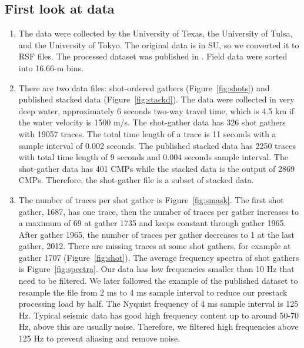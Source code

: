 \subsection{First look at data}

\begin{enumerate}

\item The data were collected by the University of Texas, the University of Tulsa, and the University of Tokyo. The original data is in SU, so we converted it to RSF files. The processed dataset was published in \cite{Moore}. Field data were sorted into 16.66-m bins.   

\item There are two data files: shot-ordered gathers (Figure~\ref{fig:shots}) and published stacked data (Figure~\ref{fig:stackd}). The data were collected in very deep water, approximately 6 seconds two-way travel time, which is 4.5 km if the water velocity is 1500 m/s. The shot-gather data has 326 shot gathers with 19057 traces. The total time length of a trace is 11 seconds with a sample interval of 0.002 seconds. The published stacked data has 2250 traces with total time length of 9 seconds and 0.004 seconds sample interval. The shot-gather data has 401 CMPs while the stacked data is the output of 2869 CMPs. Therefore, the shot-gather file is a subset of stacked data.  

\item The number of traces per shot gather is Figure~\ref{fig:smask}. The first shot gather, 1687, has one trace, then the number of traces per gather increases to a maximum of 69 at gather 1735 and keeps constant through gather 1965. After gather 1965, the number of traces per gather decreases to 1 at the last gather, 2012. There are missing traces at some shot gathers, for example at gather 1707 (Figure~\ref{fig:shot}). The average frequency spectra of shot gathers is Figure~\ref{fig:spectra}. Our data has low frequencies smaller than 10 Hz that need to be filtered. We later followed the example of the published dataset \cite[]{Moore} to resample the file from 2 ms to 4 ms sample interval to reduce our prestack processing load by half. The Nyquist frequency of 4 ms sample interval is 125 Hz. Typical seismic data has good high frequency content up to around 50-70 Hz, above this are usually noise. Therefore, we filtered high frequencies above 125 Hz to prevent aliasing and remove noise.    


\end{enumerate}\clearpage

